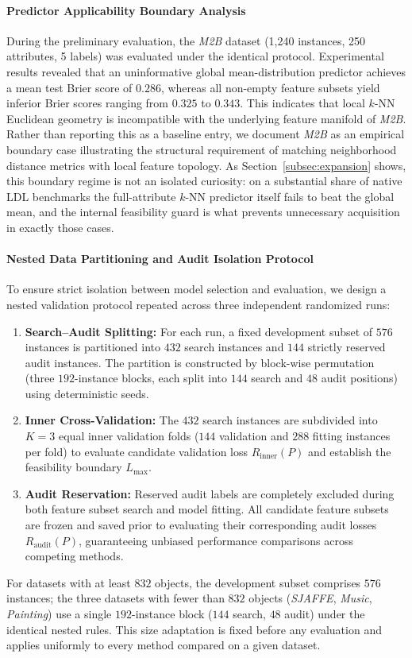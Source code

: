 \paragraph{Predictor Applicability Boundary Analysis}
During the preliminary evaluation, the \textit{M2B} dataset (1,240 instances, 250 attributes, 5 labels) was evaluated under the identical protocol. Experimental results revealed that an uninformative global mean-distribution predictor achieves a mean test Brier score of $0.286$, whereas all non-empty feature subsets yield inferior Brier scores ranging from $0.325$ to $0.343$. This indicates that local $k$-NN Euclidean geometry is incompatible with the underlying feature manifold of \textit{M2B}. Rather than reporting this as a baseline entry, we document \textit{M2B} as an empirical boundary case illustrating the structural requirement of matching neighborhood distance metrics with local feature topology. As Section~\ref{subsec:expansion} shows, this boundary regime is not an isolated curiosity: on a substantial share of native LDL benchmarks the full-attribute $k$-NN predictor itself fails to beat the global mean, and the internal feasibility guard is what prevents unnecessary acquisition in exactly those cases.

\paragraph{Nested Data Partitioning and Audit Isolation Protocol}
To ensure strict isolation between model selection and evaluation, we design a nested validation protocol repeated across three independent randomized runs:
\begin{enumerate}[label=(\arabic*), leftmargin=*]
	\item \textbf{Search--Audit Splitting:} For each run, a fixed development subset of $576$ instances is partitioned into $432$ search instances and $144$ strictly reserved audit instances. The partition is constructed by block-wise permutation (three $192$-instance blocks, each split into $144$ search and $48$ audit positions) using deterministic seeds.
	\item \textbf{Inner Cross-Validation:} The $432$ search instances are subdivided into $K=3$ equal inner validation folds ($144$ validation and $288$ fitting instances per fold) to evaluate candidate validation loss $R_{\mathrm{inner}}(P)$ and establish the feasibility boundary $L_{\max}$.
	\item \textbf{Audit Reservation:} Reserved audit labels are completely excluded during both feature subset search and model fitting. All candidate feature subsets are frozen and saved prior to evaluating their corresponding audit losses $R_{\mathrm{audit}}(P)$, guaranteeing unbiased performance comparisons across competing methods.
\end{enumerate}
For datasets with at least $832$ objects, the development subset comprises $576$ instances; the three datasets with fewer than $832$ objects (\textit{SJAFFE}, \textit{Music}, \textit{Painting}) use a single $192$-instance block ($144$ search, $48$ audit) under the identical nested rules. This size adaptation is fixed before any evaluation and applies uniformly to every method compared on a given dataset.
